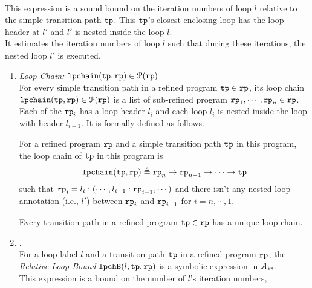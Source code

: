 \begin{enumerate}
\\
This expression is a sound bound on the iteration numbers of loop $l$ relative to the simple transition path $\mathtt{tp}$.
This $\mathtt{tp}$'s closest enclosing loop has the loop header at $l'$ and $l'$ is nested inside the loop $l$.
\\
It estimates the iteration numbers of loop $l$ such that during these iterations, the nested loop $l'$ is executed.
\begin{enumerate}
  \item \emph{Loop Chain:} $\mathtt{lpchain}(\mathtt{tp}, \mathtt{rp}) \in \mathcal{P}(\mathtt{rp})$ 
  \\
  For every simple transition path in a refined program $\mathtt{tp} \in \mathtt{rp}$,
  its loop chain $\mathtt{lpchain}(\mathtt{tp}, \mathtt{rp}) \in \mathcal{P}(\mathtt{rp})$ 
  is a list of sub-refined program $\mathtt{rp}_1, \cdots, \mathtt{rp}_n \in \mathtt{rp}$.
  Each of the $\mathtt{rp}_i$ has a loop header $l_i$ and
 each loop $l_{i}$ is nested inside the loop with header $l_{i+1}$. It is formally defined as follows.
\begin{defn}
  \label{def:loopchain}
For a refined program $\mathtt{rp}$ and a simple transition path $\mathtt{tp}$ in this program, the loop chain of
$\mathtt{tp}$ in this program is
%
\[ 
  \mathtt{lpchain}(\mathtt{tp}, \mathtt{rp}) 
  \triangleq 
\mathtt{rp}_n \to \mathtt{rp}_{n-1} \to \cdots \to \mathtt{tp}
\]
such that 
$\mathtt{rp}_{i}= l_i : (\cdots, l_{i - 1} : \mathtt{rp}_{i-1}, \cdots)$ and
 there isn't any nested loop annotation (i.e., $l'$) between $\mathtt{rp}_{i}$ and $\mathtt{rp}_{i - 1}$ for $i = n, \cdots, 1$.
\end{defn}
%
Every transition path in a refined program $\mathtt{tp} \in \mathtt{rp}$ has a unique loop chain.
%
%
%
\item  {}.
\\
For a loop label $l$ and a transition path $\mathtt{tp}$ in a refined program $\mathtt{rp}$,
the \emph{Relative Loop Bound} $\mathtt{lpchB}(l, \mathtt{tp}, \mathtt{rp})$ is a symbolic expression in $\mathcal{A}_{\mathtt{in}}$.
\\
This expression is a bound on the number of $l$'s iteration numbers,

\end{enumerate}
\end{enumerate}
